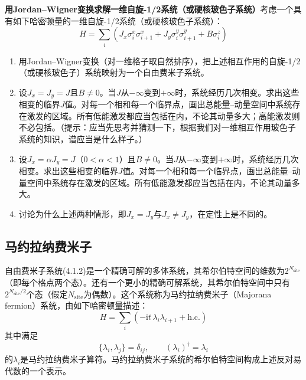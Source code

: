 \textbf{用Jordan--Wigner变换求解一维自旋-1/2系统（或硬核玻色子系统）}\quad 考虑一个具有如下哈密顿量的一维自旋-1/2系统（或硬核玻色子系统）：
\begin{equation*}
H=\sum_{i}\left(J_{x}\sigma_{i}^{x}\sigma_{i+1}^{x}+J_{y}\sigma_{i}^{y}\sigma_{i+1}^{y}+B\sigma_{i}^{z}\right)
\end{equation*}
\begin{enumerate}
\item 用Jordan--Wigner变换（对一维格子取自然排序），把上述相互作用的自旋-1/2（或硬核玻色子）系统映射为一个自由费米子系统。
\item 设$J_x=J_y=J$且$B\neq 0$。当$J$从$-\infty$变到$+\infty$时，系统经历几次相变。求出这些相变的临界$J$值。对每一个相和每一个临界点，画出总能量--动量空间中系统存在激发的区域。所有低能激发都应当包括在内，不论其动量多大；高能激发则不必包括。（提示：应当先思考并猜测一下，根据我们对一维相互作用玻色子系统的知识，谱应当是什么样子。）
\item 设$J_x=\alpha J_y=J$（$0<\alpha<1$）且$B\neq 0$。当$J$从$-\infty$变到$+\infty$时，系统经历几次相变。求出这些相变的临界$J$值。对每一个相和每一个临界点，画出总能量--动量空间中系统存在激发的区域。所有低能激发都应当包括在内，不论其动量多大。
\item 讨论为什么上述两种情形，即$J_x=J_y$与$J_x\neq J_y$，在定性上是不同的。
\end{enumerate}

\subsection{马约拉纳费米子}

自由费米子系统(4.1.2)是一个精确可解的多体系统，其希尔伯特空间的维数为$2^{N_{\mathrm{site}}}$（即每个格点两个态）。还有一个更小的精确可解系统，其希尔伯特空间中只有$2^{N_{\mathrm{site}}/2}$个态（假定$N_{\mathrm{site}}$为偶数）。这个系统称为马约拉纳费米子（Majorana fermion）系统，由如下哈密顿量描述：
\begin{equation*}
H=\sum_{i}(-\mathrm{i}t\,\lambda_{i}\lambda_{i+1}+\text{h.c.})\tag{4.1.7}
\end{equation*}
其中满足
\begin{equation*}
\{\lambda_{i},\lambda_{j}\}=\delta_{ij},\qquad (\lambda_{i})^{\dagger}=\lambda_{i}\tag{4.1.8}
\end{equation*}
的$\lambda_{i}$是马约拉纳费米子算符。马约拉纳费米子系统的希尔伯特空间构成上述反对易代数的一个表示。

